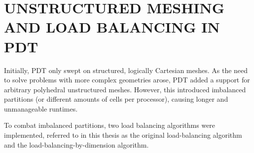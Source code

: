%
%
%
%

\chapter{UNSTRUCTURED MESHING AND LOAD BALANCING IN PDT}\label{cha:lb}

Initially, PDT only swept on structured, logically Cartesian meshes. As the need to solve problems with more complex geometries arose, PDT added a support for arbitrary polyhedral unstructured meshes. However, this introduced imbalanced partitions (or different amounts of cells per processor), causing longer and unmanageable runtimes.

To combat imbalanced partitions, two load balancing algorithms were implemented, referred to in this thesis as the original load-balancing algorithm \cite{mastersthesis,mc2017} and the load-balancing-by-dimension algorithm.

